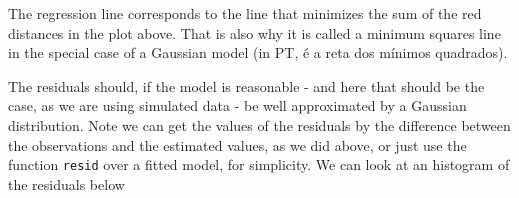 \documentclass[
]{book}
\newenvironment{Shaded}{\begin{snugshade}}{\end{snugshade}}
\newcommand{\AttributeTok}[1]{\textcolor[rgb]{0.13,0.29,0.53}{#1}}
\newcommand{\CommentTok}[1]{\textcolor[rgb]{0.56,0.35,0.01}{\textit{#1}}}
\newcommand{\ConstantTok}[1]{\textcolor[rgb]{0.56,0.35,0.01}{#1}}
\newcommand{\DecValTok}[1]{\textcolor[rgb]{0.00,0.00,0.81}{#1}}
\newcommand{\FloatTok}[1]{\textcolor[rgb]{0.00,0.00,0.81}{#1}}
\newcommand{\FunctionTok}[1]{\textcolor[rgb]{0.13,0.29,0.53}{\textbf{#1}}}
\newcommand{\NormalTok}[1]{#1}
\newcommand{\OtherTok}[1]{\textcolor[rgb]{0.56,0.35,0.01}{#1}}
\newcommand{\SpecialCharTok}[1]{\textcolor[rgb]{0.81,0.36,0.00}{\textbf{#1}}}
\newcommand{\StringTok}[1]{\textcolor[rgb]{0.31,0.60,0.02}{#1}}
\begin{document}
The regression line corresponds to the line that minimizes the sum of the red distances in the plot above. That is also why it is called a minimum squares line in the special case of a Gaussian model (in PT, é a reta dos mínimos quadrados).

The residuals should, if the model is reasonable - and here that should be the case, as we are using simulated data - be well approximated by a Gaussian distribution. Note we can get the values of the residuals by the difference between the observations and the estimated values, as we did above, or just use the function \texttt{resid} over a fitted model, for simplicity. We can look at an histogram of the residuals below

\begin{Shaded}
\end{Shaded}
\end{document}
